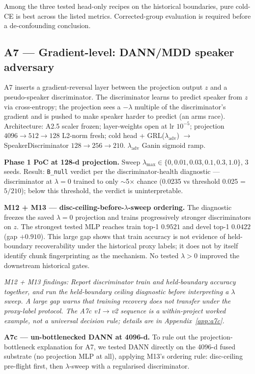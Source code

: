 Among the three tested head-only recipes on the historical boundaries, pure cold-CE is best across the listed metrics. Corrected-group evaluation is required before a de-confounding conclusion.

\subsection{A7 — Gradient-level: DANN/MDD speaker adversary}
\label{ssec:a7}

A7 inserts a gradient-reversal layer between the projection output $z$ and a pseudo-speaker discriminator. The discriminator learns to predict speaker from $z$ via cross-entropy; the projection sees a $-\lambda$ multiple of the discriminator's gradient and is pushed to make speaker harder to predict (an arms race). Architecture: A2.5 scaler frozen; layer-weights open at lr $10^{-5}$; projection $4096 \to 512 \to 128$ L2-norm fresh; cold head + GRL($\lambda_{\text{adv}}$) $\to$ SpeakerDiscriminator $128 \to 256 \to 210$. $\lambda_{\text{adv}}$ Ganin sigmoid ramp.

\textbf{Phase 1 PoC at 128-d projection.} Sweep $\lambda_{\max} \in \{0, 0.01, 0.03, 0.1, 0.3, 1.0\}$, 3 seeds. Result: \texttt{B\_null} verdict per the discriminator-health diagnostic — discriminator at $\lambda{=}0$ trained to only $\sim$5$\times$ chance (0.0235 vs threshold 0.025 = $5/210$); below this threshold, the verdict is uninterpretable.

\textbf{M12 + M13 --- disc-ceiling-before-$\lambda$-sweep ordering.} The diagnostic freezes the saved $\lambda=0$ projection and trains progressively stronger discriminators on $z$. The strongest tested MLP reaches train top-1 $0.9521$ and devel top-1 $0.0422$ (gap $+0.910$). This large gap shows that train accuracy is not evidence of held-boundary recoverability under the historical proxy labels; it does not by itself identify chunk fingerprinting as the mechanism. No tested $\lambda>0$ improved the downstream historical gates.

\textit{M12 + M13 findings:} \emph{Report discriminator train and held-boundary accuracy together, and run the held-boundary ceiling diagnostic before interpreting a $\lambda$ sweep. A large gap warns that training recovery does not transfer under the proxy-label protocol. The A7c v1$\to$v2 sequence is a within-project worked example, not a universal decision rule; details are in Appendix~\ref{app:a7c}.}

\textbf{A7c --- un-bottlenecked DANN at 4096-d.} To rule out the projection-bottleneck explanation for A7, we tested DANN directly on the 4096-d fused substrate (no projection MLP at all), applying M13's ordering rule: disc-ceiling pre-flight first, then $\lambda$-sweep with a regularised discriminator.


